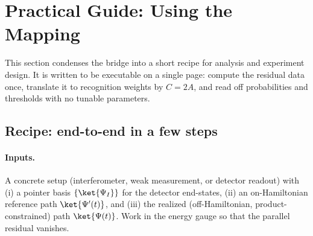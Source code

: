 \documentclass[11pt,letterpaper]{article}
\theoremstyle{definition}
\begin{document}
\section{Practical Guide: Using the Mapping}
\label{sec:practical-guide}

This section condenses the bridge into a short recipe for analysis and experiment design. It is written to be executable on a single page: compute the residual data once, translate it to recognition weights by \(C=2A\), and read off probabilities and thresholds with no tunable parameters.

\subsection{Recipe: end-to-end in a few steps}

\paragraph{Inputs.}
A concrete setup (interferometer, weak measurement, or detector readout) with
(i) a pointer basis \(\{\ket{\Psi_I}\}\) for the detector end-states,
(ii) an on-Hamiltonian reference path \(\ket{\Psi'(t)}\), and
(iii) the realized (off-Hamiltonian, product-constrained) path \(\ket{\Psi(t)}\).
Work in the energy gauge so that the parallel residual vanishes.
\end{document}
